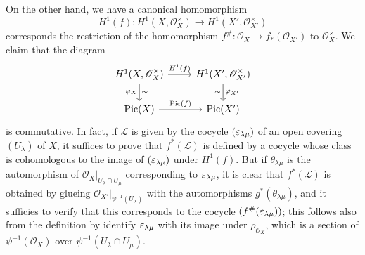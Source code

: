 On the other hand, we have a canonical homomorphism
\[H^1(f):H^1(X,\mathscr{O}_X^{\times})\to H^1(X',\mathscr{O}_{X'}^{\times})\]
corresponds the restriction of the homomorphism $f^{\#}:\mathscr{O}_X\to f_*(\mathscr{O}_{X'})$ to $\mathscr{O}_X^{\times}$. We claim that the diagram
\[\begin{tikzcd}
H^1(X,\mathscr{O}_X^{\times})\ar[r,"H^1(f)"]\ar[d,swap,"\varphi_X","\sim"']&H^1(X',\mathscr{O}_{X'}^{\times})\ar[d,"\varphi_{X'}","\sim"']\\
\Pic(X)\ar[r,"\Pic(f)"]&\Pic(X')
\end{tikzcd}\]
is commutative. In fact, if $\mathscr{L}$ is given by the cocycle $(\varepsilon_{\lambda\mu})$ of an open covering $(U_\lambda)$ of $X$, it suffices to prove that $f^*(\mathscr{L})$ is defined by a cocycle whose class is cohomologous to the image of $(\varepsilon_{\lambda\mu})$ under $H^1(f)$. But if $\theta_{\lambda\mu}$ is the automorphism of $\mathscr{O}_X|_{U_\lambda\cap U_\mu}$ corresponding to $\varepsilon_{\lambda\mu}$, it is clear that $f^*(\mathscr{L})$ is obtained by glueing $\mathscr{O}_{X'}|_{\psi^{-1}(U_\lambda)}$ with the automorphisms $g^*(\theta_{\lambda\mu})$, and it sufficies to verify that this corresponds to the cocycle $(f^{\#}(\varepsilon_{\lambda\mu}))$; this follows also from the definition by identify $\varepsilon_{\lambda\mu}$ with its image under $\rho_{\mathscr{O}_X}$, which is a section of $\psi^{-1}(\mathscr{O}_X)$ over $\psi^{-1}(U_\lambda\cap U_\mu)$.
